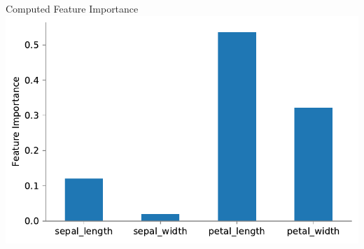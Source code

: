 \documentclass{beamer}
\begin{document}
\begin{frame}{Computed Feature Importance}
\includegraphics[scale=0.6]{feature-importance.pdf}
\end{frame}
\end{document}
